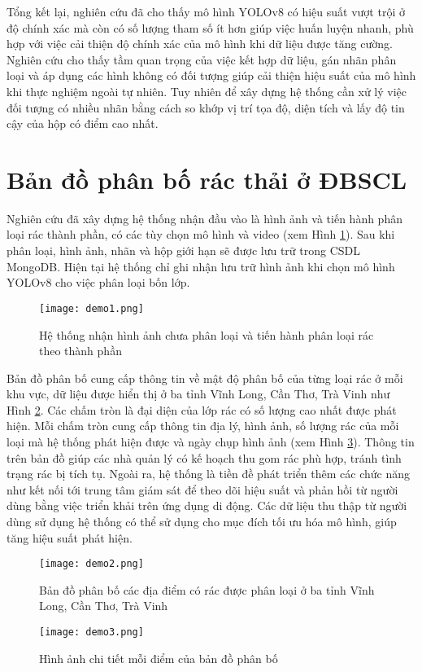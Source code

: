 \documentclass[../the.tex]{subfiles}
\begin{document}
\bigskip
{\fontsize{13}{12} \selectfont

    Tổng kết lại, nghiên cứu đã cho thấy mô hình YOLOv8 có hiệu suất vượt trội ở độ chính xác
    mà còn có số lượng tham số ít hơn giúp việc huấn luyện nhanh, phù hợp với việc cải thiện độ chính xác của mô hình khi dữ liệu được tăng cường.
    Nghiên cứu cho thấy tầm quan trọng của việc kết hợp dữ liệu, gán nhãn phân loại và áp dụng các hình không có đối tượng giúp cải thiện hiệu suất của mô hình khi thực nghiệm ngoài tự nhiên.
    Tuy nhiên để xây dựng hệ thống cần xử lý việc đối tượng có nhiều nhãn bằng cách so khớp vị trí tọa độ, diện tích và lấy độ tin cậy của hộp có điểm cao nhất.
}

\section{Bản đồ phân bố rác thải ở ĐBSCL}
{\fontsize{13}{12} \selectfont 

Nghiên cứu đã xây dựng hệ thống nhận đầu vào là hình ảnh và tiến hành phân loại rác thành phần, có các tùy chọn mô hình và video (xem Hình \ref{fig:demo1}). 
Sau khi phân loại, hình ảnh, nhãn và hộp giới hạn sẽ được lưu trữ trong CSDL MongoDB.
Hiện tại hệ thống chỉ ghi nhận lưu trữ hình ảnh khi chọn mô hình YOLOv8 cho việc phân loại bốn lớp.

}

\begin{figure}[H]
    \centering
    \texttt{[image: demo1.png]}
    \caption{Hệ thống nhận hình ảnh chưa phân loại và tiến hành phân loại rác theo thành phần}
    \label{fig:demo1}
\end{figure}

{\fontsize{13}{12} \selectfont 

Bản đồ phân bố cung cấp thông tin về mật độ phân bố của từng loại rác ở mỗi khu vực, dữ liệu được hiển thị ở ba tỉnh Vĩnh Long, Cần Thơ, Trà Vinh như Hình \ref{fig:demo2}. 
Các chấm tròn là đại diện của lớp rác có số lượng cao nhất được phát hiện. Mỗi chấm tròn cung cấp thông tin địa lý, hình ảnh, số lượng rác của mỗi loại mà hệ thống phát hiện được và ngày chụp hình ảnh (xem Hình \ref{fig:demo3}).
Thông tin trên bản đồ giúp các nhà quản lý có kế hoạch thu gom rác phù hợp, tránh tình trạng rác bị tích tụ. 
Ngoài ra, hệ thống là tiền đề phát triển thêm các chức năng như kết nối tới trung tâm giám sát để theo dõi hiệu suất và phản hồi từ người dùng bằng việc triển khải trên ứng dụng di động.
Các dữ liệu thu thập từ người dùng sử dụng hệ thống có thể sử dụng cho mục đích tối ưu hóa mô hình, giúp tăng hiệu suất phát hiện. 


}


\begin{figure}[H]
    \centering
    \texttt{[image: demo2.png]}
    \caption{Bản đồ phân bố các địa điểm có rác được phân loại ở ba tỉnh Vĩnh Long, Cần Thơ, Trà Vinh}
    \label{fig:demo2}
\end{figure}


\begin{figure}[H]
    \centering
    \texttt{[image: demo3.png]}
    \caption{Hình ảnh chi tiết mỗi điểm của bản đồ phân bố}
    \label{fig:demo3}
\end{figure}
\end{document}
